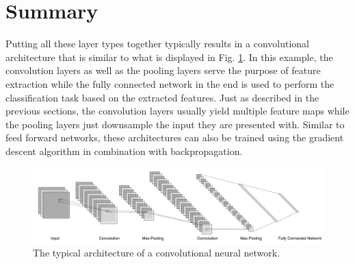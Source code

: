 \section{Summary}

Putting all these layer types together typically results in a
convolutional architecture that is similar to what is displayed in
Fig. \ref{fig:convnet}. In this example, the convolution layers as
well as the pooling layers serve the purpose of feature extraction
while the fully connected network in the end is used to perform the
classification task based on the extracted features. Just as described
in the previous sections, the convolution layers usually yield
multiple feature maps while the pooling layers just downsample the
input they are presented with.
Similar to feed forward networks, these architectures can also be
trained using the gradient descent algorithm in combination with
backpropagation.
\begin{figure}[h]
  \centering
  \includegraphics[width=\textwidth]{../figures/convnet}
  \caption{The typical architecture of a convolutional neural
    network.}
  \label{fig:convnet}
\end{figure}
